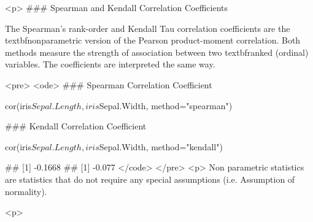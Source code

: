 <p>
### Spearman and Kendall Correlation Coefficients

The Spearman's rank-order and Kendall Tau correlation coefficients are the textbf{nonparametric} version of the Pearson product-moment correlation. 
Both methods measure the strength of association between two textbf{ranked} (ordinal) variables. 
The coefficients are interpreted the same way.

<pre>
<ode>
### Spearman Correlation Coefficient

cor(iris$Sepal.Length,iris$Sepal.Width, 
   method="spearman")
   
### Kendall Correlation Coefficient

cor(iris$Sepal.Length,iris$Sepal.Width, 
   method="kendall")

## [1] -0.1668
## [1] -0.077
</code>
</pre>
<p>
Non parametric statistics are statistics that do not require any special assumptions (i.e. Assumption of normality).

<p>

